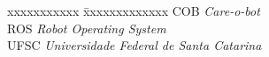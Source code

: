 \ifx\isenglish\undefined
{}
\else
{}
\fi


\begin{tabbing}
xxxxxxxxxxx \= xxxxxxxxxxxxx \kill
\textsc{COB}            \> \textit{Care-o-bot}\\
\textsc{ROS}            \> \textit{Robot Operating System}\\
\textsc{UFSC} \> \textit{Universidade Federal de Santa Catarina}\\
\end{tabbing}

